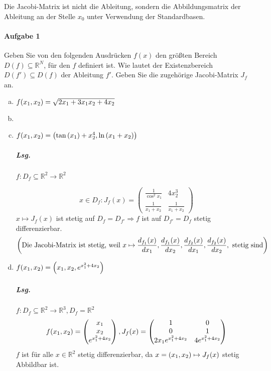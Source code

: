 \documentclass{scrreprt}
\begin{document}
Die Jacobi-Matrix ist nicht die Ableitung, sondern die Abbildungsmatrix
der Ableitung an der Stelle $x_0$ unter Verwendung der Standardbasen.

\paragraph{Aufgabe 1} Geben Sie von den folgenden Ausdrücken $f(x)$ den größten Bereich
$D(f) \subseteq \mathbb{R}^N$, für den $f$ definiert ist.
Wie lautet der Existenzbereich $D(f') \subseteq D(f)$ der Ableitung $f'$.
Geben Sie die zugehörige Jacobi-Matrix $J_f$ an.
\begin{enumerate}[a)]
\item $f\qty(x_1, x_2) = \sqrt{2x_1 + 3x_1x_2 + 4x_2}$
\item
\item $f\qty(x_1, x_2) = \qty(\tan\qty(x_1) + x_2^4, \ln\qty(x_1 + x_2))$
  \subparagraph{Lsg.} $f \colon D_f \subseteq \mathbb{R}^2 \to \mathbb{R}^2$
  \[
    x \in D_f \colon J_f (x) = \begin{pmatrix}
      \frac{1}{\cos^2 x_1} & 4 x_2^3 \\
      \frac{1}{x_1 + x_2} & \frac{1}{x_1 + x_2}
    \end{pmatrix}
  \]
  $x \mapsto J_f(x)$ ist stetig auf $D_f = D_{f'} \Rightarrow f$ ist auf
  $D_{f'} = D_f$ stetig differenzierbar.
  \[
    \qty(\text{Die Jacobi-Matrix ist stetig, weil }
     x \mapsto \frac{d_{f_1}(x)}{dx_1}, \frac{d_{f_1}(x)}{dx_2}, \frac{d_{f_2}(x)}{dx_1}, \frac{d_{f_2}(x)}{dx_2},
    \text{ stetig sind})
  \]

\item $f\qty(x_1, x_2) = \qty(x_1, x_2, e^{x_1^2 + 4 x_2})$
  \subparagraph{Lsg.} $f \colon D_f \subseteq \mathbb{R}^2 \to \mathbb{R}^3, D_f = \mathbb{R}^2$
  \[
    f\qty(x_1, x_2) = \begin{pmatrix}
      x_1 \\
      x_2 \\
      e^{x_1^2 + 4x_2}
    \end{pmatrix},
    J_f(x) = \begin{pmatrix}
      1 & 0 \\
      0 & 1 \\
      2 x_1 e^{x_1^2 + 4 x_2} & 4e^{x_1^2 + 4x_2}
    \end{pmatrix}
  \]
  $f$ ist für alle $x \in \mathbb{R}^2$ stetig differenzierbar, da
  $x = \qty(x_1, x_2) \mapsto J_f(x)$ stetig Abbildbar ist.


\end{enumerate}
\end{document}
